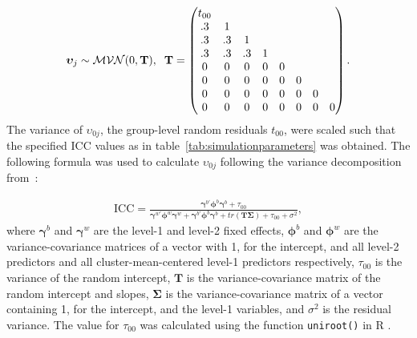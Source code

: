 \documentclass[10pt, a4paper, titlepage]{article}
\begin{document}
\begin{subequations} 
\begin{align}
    \boldsymbol{\upsilon}_{j} \sim \mathcal{MVN}(0, \mathbf{T}), \hspace{.2cm}
    \mathbf{T} = \begin{pmatrix}
        t_{00}& & & & & & \\
          .3& 1& & & & & \\
          .3& .3& 1& & & & \\
          .3& .3& .3& 1& & & \\
          0& 0& 0& 0& 0& & \\
          0& 0& 0& 0& 0& 0& \\
          0& 0& 0& 0& 0& 0& 0 \\
          0& 0& 0& 0& 0& 0& 0& 0
    \end{pmatrix} \label{eq:T}.
\end{align}
\end{subequations}
The variance of $\upsilon_{0j}$, the group-level random residuals $t_{00}$, were scaled such that the specified ICC values as in table~\ref{tab:simulationparameters} was obtained. The following formula was used to calculate $\upsilon_{0j}$ following the variance decomposition from~\cite{rights2019}:

\begin{align}
\label{eq:variancedecomposition}
\text{ICC} = \frac{\boldsymbol{\gamma}^{b'}\boldsymbol{\phi}^{b}\boldsymbol{\gamma}^{b} + \tau_{00}}{\boldsymbol{\gamma}^{w'}\boldsymbol{\phi}^{w}\boldsymbol{\gamma}^{w} + \boldsymbol{\gamma}^{b'}\boldsymbol{\phi}^{b}\boldsymbol{\gamma}^{b} + tr(\mathbf{T}\boldsymbol{\Sigma})+ \tau_{00} + \sigma^{2}},
\end{align} where $\boldsymbol{\gamma}^{b}$ and $\boldsymbol{\gamma}^{w}$ are the level-1 and level-2 fixed effects, $\boldsymbol{\phi}^{b}$ and $\boldsymbol{\phi}^{w}$ are the variance-covariance matrices of a vector with 1, for the intercept, and all level-2 predictors and all cluster-mean-centered level-1 predictors respectively, $\tau_{00}$ is the variance of the random intercept, $\mathbf{T}$ is the variance-covariance matrix of the random intercept and slopes, $\boldsymbol{\Sigma}$ is the variance-covariance matrix of a vector containing 1, for the intercept, and the level-1 variables, and $\sigma^{2}$ is the residual variance. The value for $\tau_{00}$ was calculated using the function \texttt{uniroot()} in R \citep{rcoreteam2023}.
\end{document}
